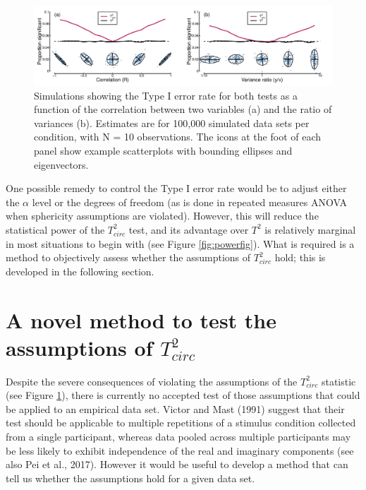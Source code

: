 \documentclass[]{article}
\begin{document}
\begin{figure}
\centering
\includegraphics{figures/falsealarms.pdf}
\caption{\label{fig:falsealarms}Simulations showing the Type I error rate for both tests as a function of the correlation between two variables (a) and the ratio of variances (b). Estimates are for 100,000 simulated data sets per condition, with N = 10 observations. The icons at the foot of each panel show example scatterplots with bounding ellipses and eigenvectors.}
\end{figure}

One possible remedy to control the Type I error rate would be to adjust either the \(\alpha\) level or the degrees of freedom (as is done in repeated measures ANOVA when sphericity assumptions are violated). However, this will reduce the statistical power of the \(T^2_{circ}\) test, and its advantage over \(T^2\) is relatively marginal in most situations to begin with (see Figure \ref{fig:powerfig}). What is required is a method to objectively assess whether the assumptions of \(T^2_{circ}\) hold; this is developed in the following section.

\hypertarget{a-novel-method-to-test-the-assumptions-of-t2_circ}{%
\section{\texorpdfstring{A novel method to test the assumptions of \(T^2_{circ}\)}{A novel method to test the assumptions of T\^{}2\_\{circ\}}}\label{a-novel-method-to-test-the-assumptions-of-t2_circ}}

Despite the severe consequences of violating the assumptions of the \(T^2_{circ}\) statistic (see Figure \ref{fig:falsealarms}), there is currently no accepted test of those assumptions that could be applied to an empirical data set. Victor and Mast (1991) suggest that their test should be applicable to multiple repetitions of a stimulus condition collected from a single participant, whereas data pooled across multiple participants may be less likely to exhibit independence of the real and imaginary components (see also Pei et al., 2017). However it would be useful to develop a method that can tell us whether the assumptions hold for a given data set.
\end{document}
